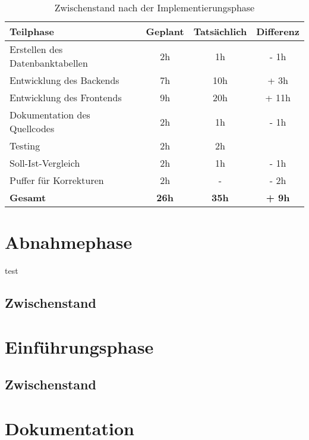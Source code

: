 \documentclass[12pt, xcolor=dvipsnames]{scrartcl}
\begin{document}
\begin{table}[H]
	\centering
	\begin{tabular}{lccc}

		\rowcolor{white!15}				
		\textbf{Teilphase} & \textbf{Geplant} & \textbf{Tatsächlich} & \textbf{Differenz} \\\hline		
		

		Erstellen des Datenbanktabellen & 2h & 1h & - 1h\\	    
	    Entwicklung des Backends & 7h & 10h & + 3h\\	    
	    Entwicklung des Frontends & 9h & 20h & + 11h\\	     
	    Dokumentation des Quellcodes & 2h & 1h & - 1h \\	      
   	    Testing & 2h & 2h & \\
   	    Soll-Ist-Vergleich & 2h & 1h & - 1h \\
   	    Puffer für Korrekturen & 2h & - & - 2h\\\hline   	    	    	    

		\rowcolor{white!15}				
		\textbf{Gesamt} & \textbf{26h} & \textbf{35h} & \textbf{+ 9h} \\			

	    
	\end{tabular}
	\caption{Zwischenstand nach der Implementierungsphase}
	\label{tab:zwischenstand_implementierungsphase}
	\end{table}

\section{Abnahmephase}
	test

\subsection{Zwischenstand}

\section{Einführungsphase}

\subsection{Zwischenstand}


\section{Dokumentation}
\end{document}

